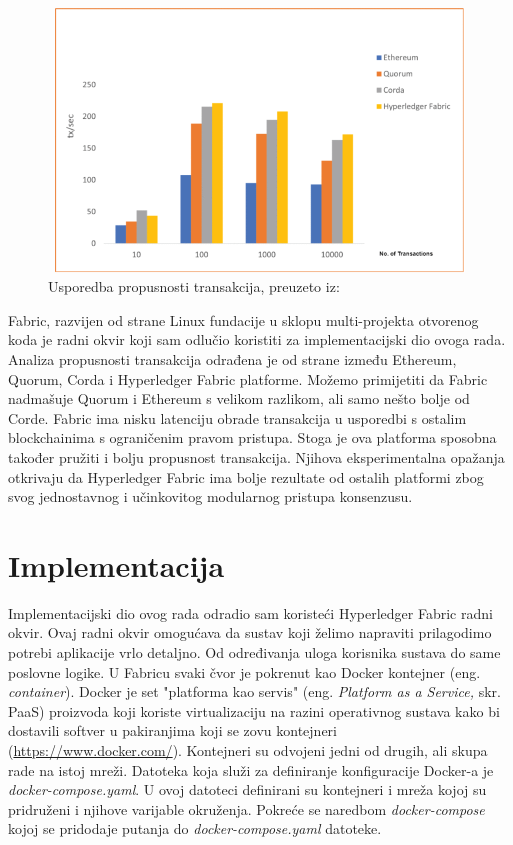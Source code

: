 \documentclass[times, utf8, diplomski]{fer}
\begin{document}
\begin{figure}[htb]
\centering
\includegraphics[width=13cm, height=7cm]{imgs/monra10-CSDE92-large.png}
\caption{Usporedba propusnosti transakcija,  preuzeto iz: \cite{9411380}}
\label{fig:usporedba}
\end{figure}


Fabric, razvijen od strane Linux fundacije u sklopu multi-projekta otvorenog koda je radni okvir koji sam odlučio koristiti za implementacijski dio ovoga rada. Analiza propusnosti transakcija odrađena je od strane \citep{9411380} između Ethereum, Quorum, Corda i Hyperledger Fabric platforme. Možemo primijetiti da Fabric nadmašuje Quorum i Ethereum s velikom razlikom, ali samo nešto bolje od Corde. Fabric ima nisku latenciju obrade transakcija u usporedbi s ostalim blockchainima s ograničenim pravom pristupa. Stoga je ova platforma sposobna također pružiti i bolju propusnost transakcija. Njihova eksperimentalna opažanja otkrivaju da Hyperledger Fabric ima bolje rezultate od ostalih platformi zbog svog jednostavnog i učinkovitog modularnog pristupa konsenzusu.

\chapter{Implementacija}
Implementacijski dio ovog rada odradio sam koristeći Hyperledger Fabric radni okvir.  Ovaj radni okvir omogućava da sustav koji želimo napraviti prilagodimo potrebi aplikacije vrlo detaljno. Od određivanja uloga korisnika sustava do same poslovne logike. U Fabricu svaki čvor je pokrenut kao Docker kontejner (eng. \textit{container}). Docker je set "platforma kao servis" (eng. \textit{Platform as a Service,} skr. PaaS) proizvoda koji koriste virtualizaciju na razini operativnog sustava kako bi dostavili softver u pakiranjima koji se zovu kontejneri (\url{https://www.docker.com/}).  Kontejneri su odvojeni jedni od drugih, ali skupa rade na istoj mreži. Datoteka koja služi za definiranje konfiguracije Docker-a je \textit{docker-compose.yaml}. U ovoj datoteci definirani su kontejneri i mreža kojoj su pridruženi i njihove varijable okruženja. Pokreće se naredbom \textit{docker-compose} kojoj se pridodaje putanja do \textit{docker-compose.yaml} datoteke.
\end{document}
